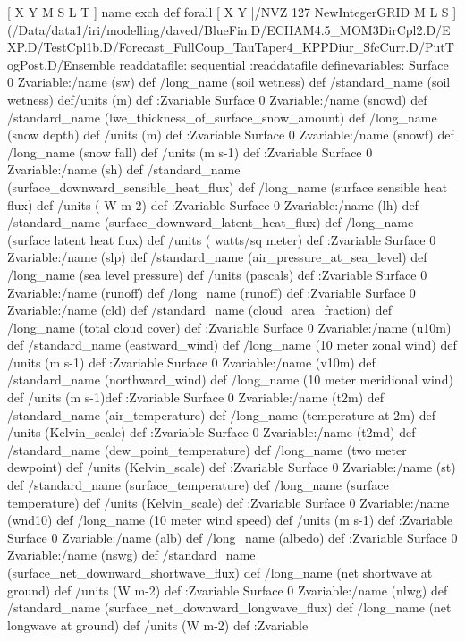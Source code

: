 \begin{ingrid}
[ X Y M S L T ] { name exch def } forall
[ X Y |/NVZ 127  NewIntegerGRID M L S ]
(/Data/data1/iri/modelling/daved/BlueFin.D/ECHAM4.5_MOM3DirCpl2.D/EXP.D/TestCpl1b.D/Forecast_FullCoup_TauTaper4_KPPDiur_SfcCurr.D/PutTogPost.D/Ensemble%
readdatafile:
sequential
:readdatafile
definevariables:
Surface 0 Zvariable:/name (sw) def /long_name (soil wetness)  def  /standard_name (soil wetness)  def/units (m) def :Zvariable
Surface 0 Zvariable:/name (snowd) def /standard_name (lwe_thickness_of_surface_snow_amount) def /long_name (snow depth) def /units (m) def :Zvariable
Surface 0 Zvariable:/name (snowf) def /long_name (snow fall)  def /units (m s-1) def :Zvariable
Surface 0 Zvariable:/name (sh) def /standard_name (surface_downward_sensible_heat_flux) def /long_name (surface sensible heat flux) def /units ( W m-2) def :Zvariable
Surface 0 Zvariable:/name (lh) def /standard_name (surface_downward_latent_heat_flux) def /long_name (surface latent heat flux) def /units ( watts/sq meter) def :Zvariable
Surface 0 Zvariable:/name (slp) def /standard_name (air_pressure_at_sea_level) def /long_name (sea level pressure) def /units (pascals) def :Zvariable
Surface 0 Zvariable:/name (runoff) def /long_name (runoff) def :Zvariable
Surface 0 Zvariable:/name (cld) def /standard_name (cloud_area_fraction) def /long_name (total cloud cover) def :Zvariable
Surface 0 Zvariable:/name (u10m) def /standard_name (eastward_wind) def /long_name (10 meter zonal wind) def /units (m s-1) def :Zvariable
Surface 0 Zvariable:/name (v10m) def /standard_name (northward_wind) def /long_name (10 meter meridional wind) def /units (m s-1)def :Zvariable
Surface 0 Zvariable:/name (t2m) def /standard_name (air_temperature) def /long_name (temperature at 2m) def /units (Kelvin_scale) def :Zvariable
Surface 0 Zvariable:/name (t2md) def /standard_name (dew_point_temperature) def /long_name (two meter dewpoint) def /units (Kelvin_scale) def :Zvariable
Surface 0 Zvariable:/name (st) def /standard_name (surface_temperature) def /long_name (surface temperature) def /units (Kelvin_scale) def :Zvariable
Surface 0 Zvariable:/name (wnd10) def /long_name (10 meter wind speed) def /units (m s-1) def :Zvariable
Surface 0 Zvariable:/name (alb) def /long_name (albedo) def :Zvariable
Surface 0 Zvariable:/name (nswg) def /standard_name (surface_net_downward_shortwave_flux) def /long_name (net shortwave at ground) def /units (W m-2) def :Zvariable
Surface 0 Zvariable:/name (nlwg) def /standard_name (surface_net_downward_longwave_flux) def /long_name (net longwave at ground) def /units (W m-2) def :Zvariable

\end{ingrid}
